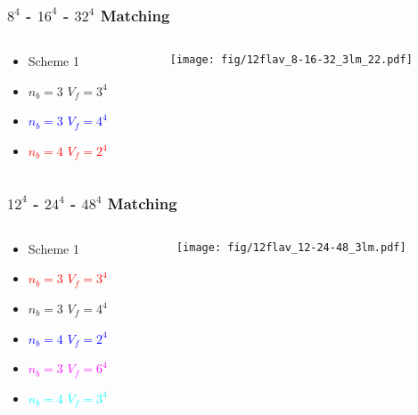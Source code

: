 \begin{frame}
  \frametitle{$8^4$ - $16^4$ - $32^4$ Matching}
  \begin{columns}[T]
    \begin{column}{.3\textwidth}
      \begin{block}{}
        \begin{itemize}
          \item Scheme 1
          \item $n_b=3$ $V_f=3^4$
          \item \textcolor{blue}{$n_b=3$ $V_f=4^4$}
          \item \textcolor{red}{$n_b=4$ $V_f=2^4$}
        \end{itemize}
      \end{block}
    \end{column}
    \begin{column}{.7\textwidth}
      \begin{block}{}
        \texttt{[image: fig/12flav\_8-16-32\_3lm\_22.pdf]}
      \end{block}
    \end{column}
  \end{columns}
\end{frame}

\begin{frame}
  \frametitle{$12^4$ - $24^4$ - $48^4$ Matching}
  \begin{columns}[T]
    \begin{column}{.3\textwidth}
      \begin{block}{}
        \begin{itemize}
          \item Scheme 1
          \item \textcolor{red}{$n_b=3$ $V_f=3^4$}
          \item $n_b=3$ $V_f=4^4$
          \item \textcolor{blue}{$n_b=4$ $V_f=2^4$}
          \item \textcolor{magenta}{$n_b=3$ $V_f=6^4$}
          \item \textcolor{cyan}{$n_b=4$ $V_f=3^4$}
        \end{itemize}
      \end{block}
    \end{column}
    \begin{column}{.7\textwidth}
      \begin{block}{}
        \texttt{[image: fig/12flav\_12-24-48\_3lm.pdf]}
      \end{block}
    \end{column}
  \end{columns}
\end{frame}

